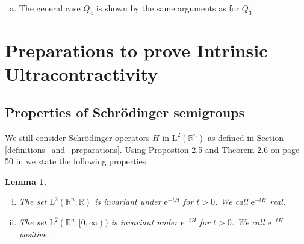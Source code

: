 \documentclass[12pt,longbibliography]{article}
\def\R{\mathbb{R}}
\newtheorem{lem}[thm]{Lemma}
\theoremstyle{definition}
\theoremstyle{remark}
\theoremstyle{example}
\begin{document}
\begin{enumerate}[a)]
\begin{enumerate}[1.)]
\item $\ln \left( Q_{3}(r) \right) = 2 \ln(r) + 2 \left( \ln^{2}(r) \right) + \alpha \left( \ln^{3}(r) \right) \leq (2+2+\alpha) \ln(r)$

\item $\ln^{2} \left( Q_{3}(r) \right) \leq \ln (2+2+\alpha) + \ln^{2}(r) \leq 2 \ln^{2}(r)$

\end{enumerate}
both hold for $r$ large. Hence, due to 1.) and 2.) we argue that
$$
\frac{r f_{k,1}\left( \ln \left( Q_{3}(r) \right) \right)}{Q_{3}(r)^{\frac{1}{2}}} \ \leq \ 2^{k} (2+2+\alpha) 
\frac{r \left( \ln^{2}(r) \right)^{k} \ln(r)}{r \ln(r) \left( \ln^{2}(r) \right)^{\frac{\alpha}{2}}} \ = \
2^{k} (2+2+\alpha) \left( \ln^{2}(r) \right)^{k-\frac{\alpha}{2}}
$$
holds for $r$ large. So, for $k \in (1,\frac{\alpha}{2})$ there exists a radius $R > 0$ such that
$$
0 \ < \ \frac{r f_{k,1}\left( \ln \left( Q_{3}(r) \right) \right)}{Q_{3}(r)^{\frac{1}{2}}} \ < \ 1
$$
holds for every $r \geq R$. All criteria of Theorem \ref{Main_Thm_2} are satisfied.

\item The general case $Q_{4}$ is shown by the same arguments as for $Q_{3}$.

\end{enumerate}








\section{Preparations to prove Intrinsic Ultracontractivity} \label{Definition_h_H}

\subsection{Properties of Schrödinger semigroups}

We still consider Schrödinger operators $H$ in $\mathrm{L}^{2}(\R^{n})$ as defined in Section \ref{definitions_and_preparations}.
Using Propostion 2.5 and Theorem 2.6 on page 50 in \cite{Ouhabaz05} we state the following properties.\\

\begin{lem} \label{positiv_H}
\
\begin{enumerate}[i.)]
\item The set $\mathrm{L}^{2}(\R^{n};\R)$ is invariant under 
$\mathrm{e}^{-tH}$ for $t>0$. We call $\mathrm{e}^{-tH}$ real.
\item The set $\mathrm{L}^{2}(\R^{n};[0,\infty))$ is invariant under $\mathrm{e}^{-tH}$ for $t>0$.
We call $\mathrm{e}^{-tH}$ positive.\\
\end{enumerate}
\end{lem} 
\end{document}

